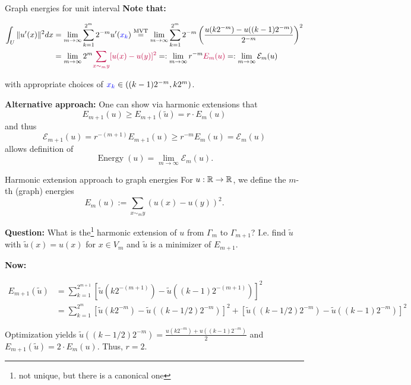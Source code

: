\begin{frame}{Graph energies for unit interval}
    \textbf{Note that:}
    \begin{tiny}
        \begin{align*}
            \int_U \| u'(x) \|^2 dx &= \lim_{m\to\infty} \sum_{k=1}^{2^m} 2^{-m} u'(\textcolor{blue}{x_k})
            \overset{\text{MVT}}= \lim_{m \to \infty} \sum_{k=1}^{2^m} 2^{-m} \left( \frac{u(k2^{-m}) - u((k-1)2^{-m})}{2^{-m}} \right)^2 \\
            &= \lim_{m \to \infty} 2^m \textcolor{purple}{\sum_{x \sim_m y} [ u(x) - u(y) ]^2}
            =: \lim_{m \to \infty} r^{-m} \textcolor{purple}{E_m(u)} =: \lim_{m\to\infty} \mathcal{E}_m (u)
        \end{align*}
    \end{tiny}
    with appropriate choices of \(\textcolor{blue}{x_k} \in ((k-1)2^{-m}, k2^m) \).

    \textbf{Alternative approach:} One can show via harmonic extensions that
    \[ E_{m+1}(u) \geq E_{m+1}(\tilde{u}) = r \cdot E_m(u) \]
    and thus
    \[ \mathcal{E}_{m+1}(u) = r^{-(m+1)} E_{m+1}(u) \geq r^{-m} E_m(u) = \mathcal{E}_m(u) \]
    allows definition of
    \[ \mathop{Energy}(u) = \lim_{m\to \infty} \mathcal{E}_m(u). \]
\end{frame}

\begin{frame}{Harmonic extension approach to graph energies}
    For \(u: \mathbb{R} \to \mathbb{R} \), we define the \(m\)-th (graph) energies
    \[ E_m(u) := \sum_{x \sim_m y} \left( u(x) - u(y) \right)^2. \]

    \textbf{Question:} What is the\footnote{not unique, but there is a canonical one} harmonic extension of \(u \) from \(\Gamma_m \) to \(\Gamma_{m+1} \)?
    I.e. find \(\tilde{u} \) with \(\tilde{u}(x) = u(x) \) for \(x \in V_m \) and \(\tilde{u} \) is a minimizer of \(E_{m+1} \).

    \textbf{Now:}
    \begin{tiny}
        \begin{align*}
            E_{m+1}(\tilde{u}) &= \sum_{k=1}^{2^{m+1}} [\tilde{u}(k2^{-(m+1)}) - \tilde{u}((k-1)2^{-(m+1)})]^2 \\
            &= \sum_{k=1}^{2^m} [\tilde{u}(k2^{-m}) - \tilde{u}((k-1/2)2^{-m})]^2 + [\tilde{u}((k-1/2)2^{-m}) - \tilde{u}((k-1)2^{-m})]^2
        \end{align*}
    \end{tiny}
    Optimization yields \(\tilde{u}((k-1/2)2^{-m}) = \frac{u(k2^{-m}) + u((k-1)2^{-m})}{2} \) and \(E_{m+1}(\tilde{u}) = 2\cdot E_m(u) \). Thus, \(r = 2 \).
\end{frame}